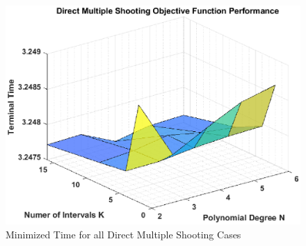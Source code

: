 \documentclass[]{article}
\begin{document}
\begin{figure}
	\centering
	\includegraphics[scale=0.75]{terminalTimeDMS.eps}
	\caption{Minimized Time for all Direct Multiple Shooting Cases}
	\label{fig:terminalTimeDMS}
\end{figure}
\end{document}
